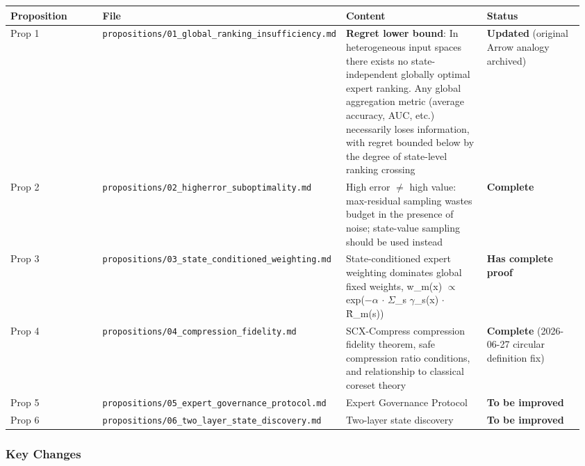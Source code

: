 \documentclass[
  12pt,
]{article}
\begin{document}
\begin{longtable}[]{@{}p{0.18\linewidth}p{0.28\linewidth}p{0.30\linewidth}p{0.20\linewidth}@{}}
\toprule\noalign{}
\begin{minipage}[b]{\linewidth}\raggedright
Proposition
\end{minipage} & \begin{minipage}[b]{\linewidth}\raggedright
File
\end{minipage} & \begin{minipage}[b]{\linewidth}\raggedright
Content
\end{minipage} & \begin{minipage}[b]{\linewidth}\raggedright
Status
\end{minipage} \\
\midrule\noalign{}
\endhead
\bottomrule\noalign{}
\endlastfoot
Prop 1 & \texttt{propositions/01\_global\_ranking\_insufficiency.md} &
\textbf{Regret lower bound}: In heterogeneous input spaces there exists no state-independent globally optimal expert ranking. Any global aggregation metric (average accuracy, AUC, etc.) necessarily loses information, with regret bounded below by the degree of state-level ranking crossing &
\textbf{Updated} (original Arrow analogy archived) \\
Prop 2 & \texttt{propositions/02\_higherror\_suboptimality.md} & High error $\neq$ high value: max-residual sampling wastes budget in the presence of noise; state-value sampling should be used instead &
\textbf{Complete} \\
Prop 3 & \texttt{propositions/03\_state\_conditioned\_weighting.md} &
State-conditioned expert weighting dominates global fixed weights, w\_m(x) $\propto$ exp($-$$\alpha$ $\cdot$ $\Sigma$\_s $\gamma$\_s(x) $\cdot$ \^{R}\_m(s)) &
\textbf{Has complete proof} \\
Prop 4 & \texttt{propositions/04\_compression\_fidelity.md} &
SCX-Compress compression fidelity theorem, safe compression ratio conditions, and relationship to classical coreset theory &
\textbf{Complete} (2026-06-27 circular definition fix) \\
Prop 5 & \texttt{propositions/05\_expert\_governance\_protocol.md} &
Expert Governance Protocol & \textbf{To be improved} \\
Prop 6 & \texttt{propositions/06\_two\_layer\_state\_discovery.md} &
Two-layer state discovery & \textbf{To be improved} \\
\end{longtable}

\subsubsection{Key Changes}\label{key-changes}
\end{document}
